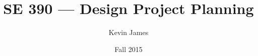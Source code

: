 \documentclass[12pt]{article}
\begin{document}
\title{SE 390 --- Design Project Planning}
\author{Kevin James}
\date{\vspace{-2ex}Fall 2015}
\maketitle\HRule

\tableofcontents
\newpage
\end{document}
